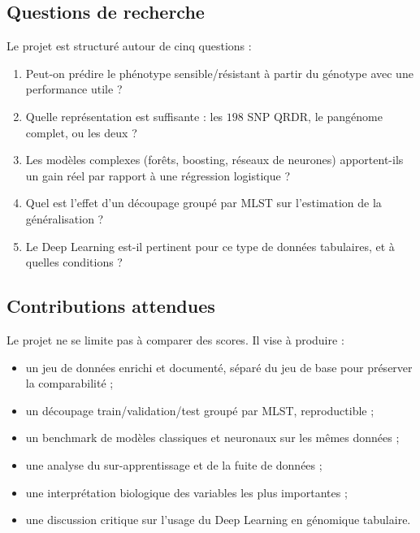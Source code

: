 \documentclass[11pt,a4paper]{article}
\begin{document}
\subsection{Questions de recherche}

Le projet est structuré autour de cinq questions :

\begin{keybox}
\begin{enumerate}[leftmargin=1.4em]
    \item Peut-on prédire le phénotype sensible/résistant à partir du génotype avec une performance utile ?
    \item Quelle représentation est suffisante : les $198$ SNP QRDR, le pangénome complet, ou les deux ?
    \item Les modèles complexes (forêts, boosting, réseaux de neurones) apportent-ils un gain réel par rapport à une régression logistique ?
    \item Quel est l'effet d'un découpage groupé par MLST sur l'estimation de la généralisation ?
    \item Le Deep Learning est-il pertinent pour ce type de données tabulaires, et à quelles conditions ?
\end{enumerate}
\end{keybox}

\subsection{Contributions attendues}

Le projet ne se limite pas à comparer des scores. Il vise à produire :
\begin{itemize}[leftmargin=1.2em]
    \item un jeu de données enrichi et documenté, séparé du jeu de base pour préserver la comparabilité ;
    \item un découpage train/validation/test groupé par MLST, reproductible ;
    \item un benchmark de modèles classiques et neuronaux sur les mêmes données ;
    \item une analyse du sur-apprentissage et de la fuite de données ;
    \item une interprétation biologique des variables les plus importantes ;
    \item une discussion critique sur l'usage du Deep Learning en génomique tabulaire.
\end{itemize}
\end{document}
